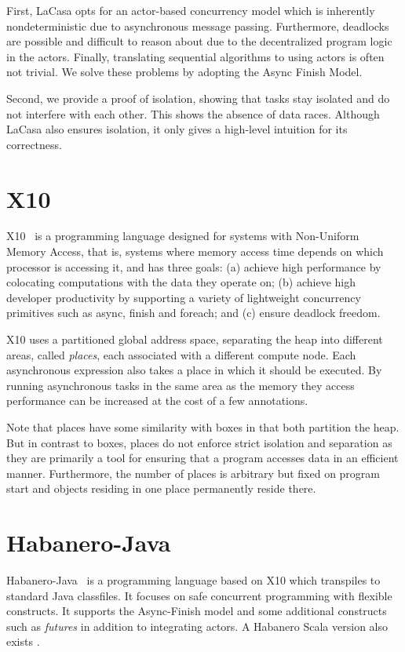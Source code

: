 First, LaCasa opts for an actor-based concurrency model which is inherently nondeterministic due to asynchronous message passing. Furthermore, deadlocks are possible and difficult to reason about due to the decentralized program logic in the actors. Finally, translating sequential algorithms to using actors is often not trivial. We solve these problems by adopting the Async Finish Model.

Second, we provide a proof of isolation, showing that tasks stay isolated and do not interfere with each other. This shows the absence of data races. Although LaCasa also ensures isolation, it only gives a high-level intuition for its correctness.

\section{X10}
X10~\cite{charles_x10_2005} is a programming language designed for systems with Non-Uniform Memory Access, that is, systems where memory access time depends on which processor is accessing it,  and has three goals: (a) achieve high performance by colocating computations with the data they operate on; (b) achieve high developer productivity by supporting a variety of lightweight concurrency primitives such as async, finish and foreach; and (c) ensure deadlock freedom.

X10 uses a partitioned global address space, separating the heap into different areas, called \textit{places}, each associated with a different compute node. Each asynchronous expression also takes a place in which it should be executed. By running asynchronous tasks in the same area as the memory they access performance can be increased at the cost of a few annotations.

Note that places have some similarity with boxes in that both partition the heap. But in contrast to boxes, places do not enforce strict isolation and separation as they are primarily a tool for ensuring that a program accesses data in an efficient manner. Furthermore, the number of places is arbitrary but fixed on program start and objects residing in one place permanently reside there.

\section{Habanero-Java}
Habanero-Java~\cite{cave_habanero-java_2011} is a programming language based on X10 which transpiles to standard Java classfiles. It focuses on safe concurrent programming with flexible constructs. It supports the Async-Finish model and some additional constructs such as \textit{futures} in addition to integrating actors. A Habanero Scala version also exists \cite{imam_integrating_2012,imam_habanero-scala_2012}.

